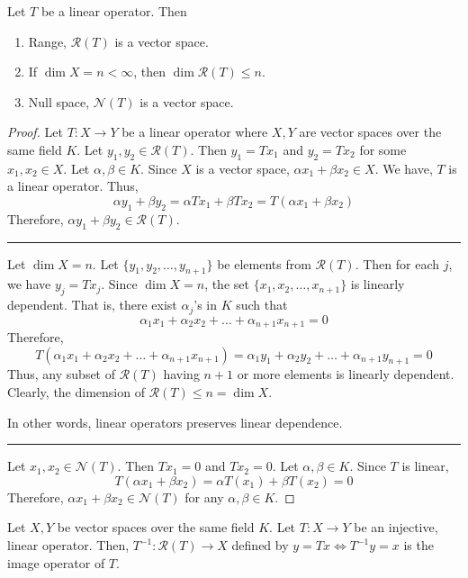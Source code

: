 \begin{theorem}
	Let $T$ be a linear operator. Then
	\begin{enumerate}
		\item Range, $\mathscr{R}(T)$ is a vector space.
		\item If $\dim X = n < \infty$, then $\dim \mathscr{R}(T) \le n$.
		\item Null space, $\mathscr{N}(T)$ is a vector space.
	\end{enumerate}
\end{theorem}
\begin{proof}
	Let $T : X \to Y$ be a linear operator where $X,Y$ are vector spaces over the same field $K$.
	Let $y_1,y_2 \in \mathscr{R}(T)$.
	Then $y_1 = Tx_1$ and $y_2 = Tx_2$ for some $x_1,x_2 \in X$.
	Let $\alpha,\beta \in K$.
	Since $X$ is a vector space, $\alpha x_1 + \beta x_2 \in X$.
	We have, $T$ is a linear operator. Thus,
	\[ \alpha y_1 + \beta y_2 = \alpha Tx_1 + \beta Tx_2 = T(\alpha x_1 + \beta x_2) \]
	Therefore, $\alpha y_1 + \beta y_2 \in \mathscr{R}(T)$.\\

	\hrule \vspace{1em}

	Let $\dim X = n$.
	Let $\{ y_1,y_2,\dots,y_{n+1}\}$ be elements from $\mathscr{R}(T)$.
	Then for each $j$, we have $y_j = Tx_j$.
	Since $\dim X = n$, the set $\{x_1,x_2,\dots,x_{n+1}\}$ is linearly dependent.
	That is, there exist $\alpha_j$'s in $K$ such that 
	\[ \alpha_1 x_1 + \alpha_2 x_2 + \dots + \alpha_{n+1} x_{n+1} = 0 \]
	Therefore,
	\[ T(\alpha_1 x_1 + \alpha_2 x_2 + \dots + \alpha_{n+1} x_{n+1}) = \alpha_1 y_1 + \alpha_2 y_2 + \dots + \alpha_{n+1} y_{n+1} = 0 \]
	Thus, any subset of $\mathscr{R}(T)$ having $n+1$ or more elements is linearly dependent.
	Clearly, the dimension of $\mathscr{R}(T) \le n = \dim X$.\\
	\begin{important}
		In other words, linear operators preserves linear dependence.
	\end{important}

	\hrule \vspace{1em}

	Let $x_1,x_2 \in \mathscr{N}(T)$.
	Then $Tx_1 = 0$ and $Tx_2 = 0$.
	Let $\alpha, \beta \in K$.
	Since $T$ is linear,
	\[ T(\alpha x_1 +\beta x_2) = \alpha T(x_1) + \beta T(x_2) = 0 \]
	Therefore, $\alpha x_1 + \beta x_2 \in \mathscr{N}(T)$ for any $\alpha, \beta \in K$.
\end{proof}
\begin{definition}[Inverse]
	Let $X,Y$ be vector spaces over the same field $K$.
	Let $T : X \to Y$ be an injective, linear operator.
	Then, $T^{-1} : \mathscr{R}(T) \to X$ defined by $y = Tx \iff T^{-1}y = x$ is the image operator of $T$.
\end{definition}
